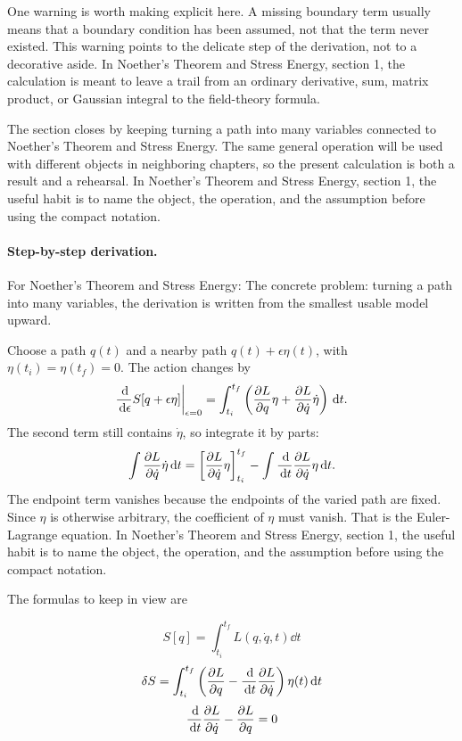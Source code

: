 One warning is worth making explicit here.  A missing boundary term usually means that a boundary condition has been assumed, not that the term never existed.  This warning points to the delicate step of the derivation, not to a decorative aside.  In Noether's Theorem and Stress Energy, section 1, the calculation is meant to leave a trail from an ordinary derivative, sum, matrix product, or Gaussian integral to the field-theory formula.

The section closes by keeping turning a path into many variables connected to Noether's Theorem and Stress Energy.  The same general operation will be used with different objects in neighboring chapters, so the present calculation is both a result and a rehearsal.  In Noether's Theorem and Stress Energy, section 1, the useful habit is to name the object, the operation, and the assumption before using the compact notation.



\paragraph{Step-by-step derivation.}

For Noether's Theorem and Stress Energy: The concrete problem: turning a path into many variables, the derivation is written from the smallest usable model upward.

Choose a path \(q(t)\) and a nearby path \(q(t)+\epsilon\eta(t)\), with \(\eta(t_i)=\eta(t_f)=0\).  The action changes by
\[
  \frac{\,\mathrm d}{\,\mathrm d\epsilon}S[q+\epsilon\eta]\bigg|_{\epsilon=0}
  =
  \int_{t_i}^{t_f}
  \left(
  \frac{\partial L}{\partial q}\eta+\frac{\partial L}{\partial\dot q}\dot\eta
  \right)\,\mathrm d t.
\]
The second term still contains \(\dot\eta\), so integrate it by parts:
\[
  \int \frac{\partial L}{\partial\dot q}\dot\eta\,\mathrm d t
  =
  \left[\frac{\partial L}{\partial\dot q}\eta\right]_{t_i}^{t_f}
  -
  \int \frac{\,\mathrm d}{\,\mathrm d t}\frac{\partial L}{\partial\dot q}\eta\,\mathrm d t.
\]
The endpoint term vanishes because the endpoints of the varied path are fixed.  Since \(\eta\) is otherwise arbitrary, the coefficient of \(\eta\) must vanish.  That is the Euler-Lagrange equation.  In Noether's Theorem and Stress Energy, section 1, the useful habit is to name the object, the operation, and the assumption before using the compact notation.

The formulas to keep in view are

\[
  S[q]=\int_{t_i}^{t_f}L(q,\dot q,t)\dd t
\]
\[
  \delta S=\int_{t_i}^{t_f}\left(\frac{\partial L}{\partial q}-\frac{\,\mathrm d}{\,\mathrm d t}\frac{\partial L}{\partial\dot q}\right)\eta(t)\,\mathrm d t
\]
\[
  \frac{\,\mathrm d}{\,\mathrm d t}\frac{\partial L}{\partial\dot q}-\frac{\partial L}{\partial q}=0
\]

